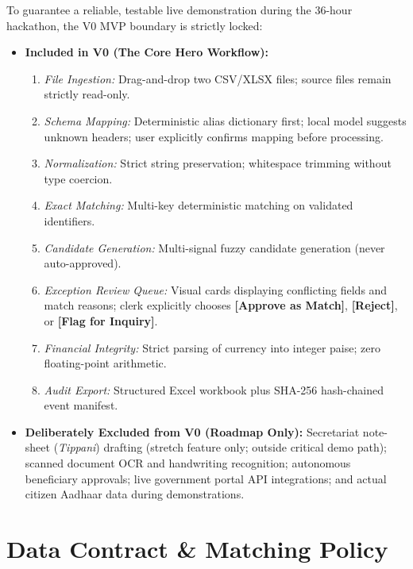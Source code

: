 \documentclass[11pt,a4paper]{article}
\begin{document}
To guarantee a reliable, testable live demonstration during the 36-hour hackathon, the V0 MVP boundary is strictly locked:
\begin{itemize}
    \item \textbf{Included in V0 (The Core Hero Workflow):}
    \begin{enumerate}[noitemsep,topsep=0pt]
        \item \textit{File Ingestion:} Drag-and-drop two CSV/XLSX files; source files remain strictly read-only.
        \item \textit{Schema Mapping:} Deterministic alias dictionary first; local model suggests unknown headers; user explicitly confirms mapping before processing.
        \item \textit{Normalization:} Strict string preservation; whitespace trimming without type coercion.
        \item \textit{Exact Matching:} Multi-key deterministic matching on validated identifiers.
        \item \textit{Candidate Generation:} Multi-signal fuzzy candidate generation (never auto-approved).
        \item \textit{Exception Review Queue:} Visual cards displaying conflicting fields and match reasons; clerk explicitly chooses \textbf{[Approve as Match]}, \textbf{[Reject]}, or \textbf{[Flag for Inquiry]}.
        \item \textit{Financial Integrity:} Strict parsing of currency into integer paise; zero floating-point arithmetic.
        \item \textit{Audit Export:} Structured Excel workbook plus SHA-256 hash-chained event manifest.
    \end{enumerate}
    \item \textbf{Deliberately Excluded from V0 (Roadmap Only):}
    Secretariat note-sheet (\textit{Tippani}) drafting (stretch feature only; outside critical demo path); scanned document OCR and handwriting recognition; autonomous beneficiary approvals; live government portal API integrations; and actual citizen Aadhaar data during demonstrations.
\end{itemize}

\vspace{0.2cm}

\section{Data Contract \& Matching Policy}
\end{document}

